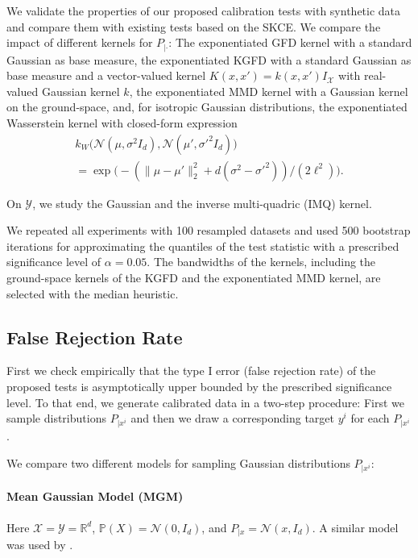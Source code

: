 \documentclass{uai2023} %
\begin{document}
We validate the properties of our proposed calibration tests with synthetic data and compare them with existing tests based on the SKCE.
We compare the impact of different kernels for $P_{|\cdot}$: The exponentiated GFD kernel with a standard Gaussian as base measure, the exponentiated KGFD with a standard Gaussian as base measure and a vector-valued kernel $K(x, x') = k(x, x') I_{\mathcal{X}}$ with real-valued Gaussian kernel $k$, the exponentiated MMD kernel with a Gaussian kernel on the ground-space, and, for isotropic Gaussian distributions, the exponentiated Wasserstein kernel with closed-form expression
\begin{multline*}
    k_W\big(\mathcal{N}(\mu, \sigma^2 I_d), \mathcal{N}(\mu', {\sigma'}^2 I_d) \big) \\
    = \exp{\big(- (\|\mu - \mu'\|_2^2 + d (\sigma^2 - {\sigma'}^2)) / (2 \ell^2)\big)}.
\end{multline*}

On $\mathcal{Y}$, we study the Gaussian and the inverse multi-quadric (IMQ) kernel.

We repeated all experiments with 100 resampled datasets and used 500 bootstrap iterations for approximating the quantiles of the test statistic with a prescribed significance level of $\alpha = 0.05$.
The bandwidths of the kernels, including the ground-space kernels of the KGFD and the exponentiated MMD kernel, are selected with the median heuristic.

\subsection{False Rejection Rate}

First we check empirically that the type I error (false rejection rate) of the proposed tests is asymptotically upper bounded by the prescribed significance level.
To that end, we generate calibrated data in a two-step procedure:
First we sample distributions $P_{|x^i}$ and then we draw a corresponding target $y^i$ for each $P_{|x^i}$.

We compare two different models for sampling Gaussian distributions $P_{|x^i}$:

\paragraph{Mean Gaussian Model (MGM)}
Here $\mathcal{X} = \mathcal{Y} = \mathbb{R}^d$, $\mathbb{P}(X) = \mathcal{N}(0, I_d)$, and $P_{|x} = \mathcal{N}(x, I_d)$. A similar model was used by \citet{widmann2022calibration}.
\end{document}
